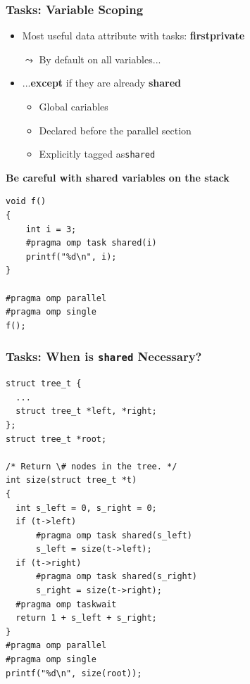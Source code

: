 \documentclass{beamer}
\begin{document}

\begin{frame}[fragile=singleslide]
  \frametitle{Tasks: Variable Scoping}

  \begin{itemize}
  \item Most useful data attribute with tasks: \textbf{firstprivate}
  \item[$\leadsto$] By default on all variables...
  \item ...\alert{\textbf{except}} if they are already \textbf{shared}
    \begin{itemize}
    \item Global cariables 
    \item Declared before the parallel section
    \item Explicitly tagged as\texttt{shared}
    \end{itemize}
  \end{itemize}

  \begin{alertblock}{\textbf{Be careful with shared variables on the stack}}
\begin{verbatim}
void f()
{
    int i = 3;
    #pragma omp task shared(i)
    printf("%d\n", i);
}

#pragma omp parallel
#pragma omp single
f();
\end{verbatim}
  \end{alertblock}
\end{frame}


\begin{frame}[fragile=singleslide]
  \frametitle{Tasks: When is \texttt{shared} Necessary?}

\begin{verbatim}
struct tree_t {
  ...
  struct tree_t *left, *right;
};
struct tree_t *root;

/* Return \# nodes in the tree. */
int size(struct tree_t *t)
{
  int s_left = 0, s_right = 0;
  if (t->left)
      #pragma omp task shared(s_left)
      s_left = size(t->left);
  if (t->right) 
      #pragma omp task shared(s_right)
      s_right = size(t->right);
  #pragma omp taskwait
  return 1 + s_left + s_right;
}
#pragma omp parallel
#pragma omp single
printf("%d\n", size(root));
\end{verbatim}
\end{frame}
\end{document}
